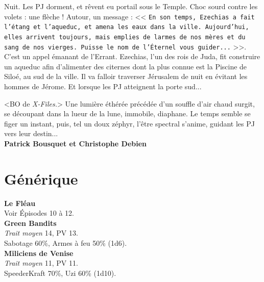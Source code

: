 \documentclass[11pt,twoside,a4paper]{book}
\begin{document}
Nuit. Les PJ dorment, et r{\^e}vent eu portail sous le Temple. Choc sourd contre les volets : une fl{\`e}che ! Autour, un message : << \texttt{En son temps, Ezechias a fait l'{\'e}tang et l'aqueduc, et amena les eaux dans la ville. Aujourd'hui, elles arrivent toujours, mais emplies de larmes de nos m{\`e}res et du sang de nos vierges. Puisse le nom de l'{\'E}ternel vous guider...} >>. C'est un appel {\'e}manant de l'Errant. Ezechias, l'un des rois de Juda, fit construire un aqueduc afin d'alimenter des citernes dont la plus connue est la Piscine de Silo{\'e}, au sud de la ville. Il va falloir traverser J{\'e}rusalem de nuit en {\'e}vitant les hommes de J{\'e}rome. Et lorsque les PJ atteignent la porte sud...

<BO de \emph{X-Files.}> Une lumi{\`e}re {\'e}th{\'e}r{\'e}e pr{\'e}c{\'e}d{\'e}e d'un souffle d'air chaud surgit, se d{\'e}coupant dans la lueur de la lune, immobile, diaphane. Le temps semble se figer un instant, puis, tel un doux z{\'e}phyr, l'{\^e}tre spectral s'anime, guidant les PJ vers leur destin...~\\

\textbf{Patrick Bousquet et Christophe Debien}~\\



\section*{G{\'e}n{\'e}rique}

\textbf{Le Fl{\'e}au}~\\
Voir {\'E}pisodes 10 {\`a} 12.~\\

\textbf{Green Bandits}~\\
\emph{Trait moyen} 14, PV 13.~\\
Sabotage 60\%, Armes {\`a} feu 50\% (1d6).~\\

\textbf{Miliciens de Venise}~\\
\emph{Trait moyen} 11, PV 11.~\\
SpeederKraft 70\%, Uzi 60\% (1d10).~\\
\end{document}
